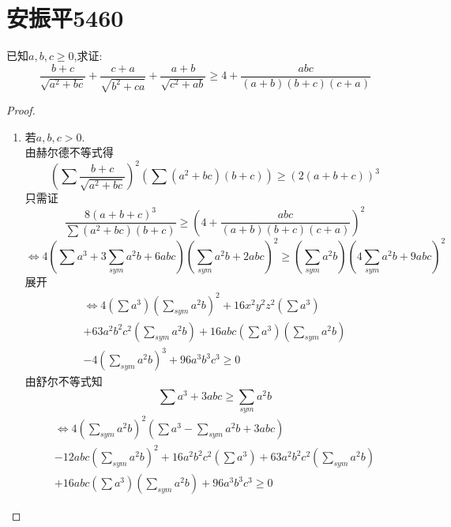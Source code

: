 \documentclass[]{article}
\title{}
\author{}
\date{}
\begin{document}
\section{安振平5460}{
已知$a,b,c\geq 0$,求证:
\begin{equation}\nonumber
    \frac{b+c}{\sqrt{a^2+bc}}+\frac{c+a}{\sqrt{b^2+ca}}+ \frac{a+b}{\sqrt{c^2+ab}}\geq 4+\frac{abc}{(a+b)(b+c)(c+a)}
\end{equation}

\begin{proof}
\begin{enumerate}
    \item 若$a,b,c>0$.\\
        由赫尔德不等式得
        \begin{equation}\nonumber
            (\sum\frac{b+c}{\sqrt{a^2+bc}})^2(\sum (a^2+bc)(b+c))\geq (2(a+b+c))^3
        \end{equation}
       只需证
       \begin{equation}\nonumber
           \frac{8(a+b+c)^3}{\sum (a^2+bc)(b+c)}\geq (4+\frac{abc}{(a+b)(b+c)(c+a)})^2
       \end{equation}
       \begin{equation}\nonumber
            \Longleftrightarrow 4(\sum a^3+3\sum\limits_{sym}a^2b+6abc)(\sum\limits_{sym}a^2b+2abc)^2\geq (\sum\limits_{sym}a^2b)(4\sum\limits_{sym}a^2b+9abc)^2
       \end{equation}
       展开
       \begin{equation}\nonumber
       \begin{split}
           \Longleftrightarrow 4(\sum a^3)(\sum\limits_{sym}a^2b)^2+16x^2y^2z^2(\sum a^3)\\+63a^2b^2c^2(\sum\limits_{sym}a^2b)+16abc(\sum a^3)(\sum\limits_{sym}a^2b)\\-4(\sum\limits_{sym}a^2b)^3+96a^3b^3c^3\geq 0
       \end{split}
       \end{equation}
       由舒尔不等式知
       \begin{equation}\nonumber
           \sum a^3+3abc\geq \sum\limits_{sym}a^2b
       \end{equation}
       \begin{equation}\nonumber
       \begin{split}
           \Longleftrightarrow 4(\sum\limits_{sym}a^2b)^2(\sum a^3-\sum\limits_{sym}a^2b+3abc)\\-12abc(\sum\limits_{sym}a^2b)^2+16a^2b^2c^2(\sum a^3)+63a^2b^2c^2(\sum\limits_{sym}a^2b)\\+16abc(\sum a^3)(\sum\limits_{sym}a^2b)+96a^3b^3c^3\geq 0

\end{split}
\end{equation}
\end{enumerate}
\end{proof}}
\end{document}
